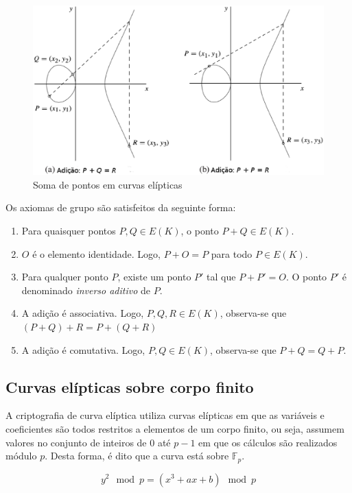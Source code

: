 \begin{figure}[h]
\includegraphics[scale=0.5, bb=0 0 484 636]{figuras/SomaECC.eps}
\caption{Soma de pontos em curvas elípticas \cite{Hankerson:2004}}
\label{fig:pontos}
\end{figure}

Os axiomas de grupo são satisfeitos da seguinte forma:
\begin{enumerate}
  \item Para quaisquer pontos $P, Q \in E(K)$, o ponto $P + Q \in E(K)$.
  \item $O$ é o elemento identidade. Logo, $P + O = P$ para todo $P \in E(K)$.
  \item Para qualquer ponto $P$, existe um ponto $P'$ tal que $P + P' = O$. O ponto $P'$ é denominado \textit{inverso aditivo} de $P$.
  \item A adição é associativa. Logo, $P, Q, R \in E(K)$, observa-se que $(P + Q) + R = P + (Q + R)$
  \item A adição é comutativa. Logo, $P, Q \in E(K)$, observa-se que $P + Q = Q + P$.
\end{enumerate}

\subsection{Curvas elípticas sobre corpo finito}
A criptografia de curva elíptica utiliza curvas elípticas em que as variáveis e coeficientes são todos restritos a elementos de um corpo finito, ou seja, assumem valores no conjunto de inteiros de 0 até $p - 1$ em que os cálculos são realizados módulo \(p\). Desta forma, é dito que a curva está sobre $\mathbb{F}_p$. \cite{Stallings:2011}

\begin{equation}
y^2 \mod p = (x^3 + ax + b) \mod p
\end{equation}

